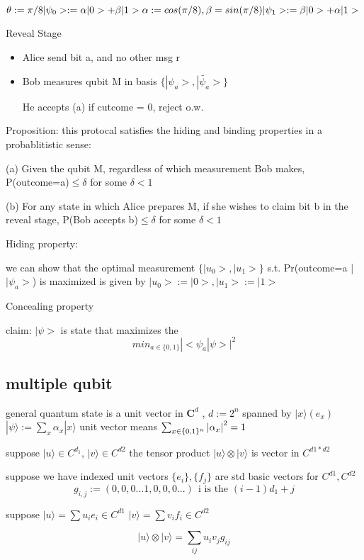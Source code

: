 \documentclass[10pt]{article}
\theoremstyle{break}
\begin{document}
$\theta := \pi/8 \\ |\psi_0> := \alpha |0> + \beta |1>\\
\alpha := cos(\pi/8), \beta = sin(\pi/8)\\|\psi_1>:=\beta |0> + \alpha |1>$

Reveal Stage 
\begin{itemize}
    \item Alice send bit a, and no other msg r 
    \item Bob measures qubit M in basis
     $\{|\psi_a>, |\tilde{\psi_a}>\}$

     He accepts (a) if cutcome = 0, reject o.w.
\end{itemize}

Proposition: this protocal satisfies the hiding and binding properties
in a probablitistic sense:

(a) Given the qubit M, regardless of which measurement Bob makes,
P(outcome=a)$\leq \delta$ for some $\delta < 1 $

(b) For any state in which Alice prepares M, if she wishes to claim bit b 
in the reveal stage, 
P(Bob accepts b)$\leq \delta$ for some $\delta < 1 $

Hiding property:

we can show that the optimal measurement $\{|u_0>,|u_1>\}$
s.t. Pr(outcome=a | $|\psi_a>$) is maximized is given by 
$|u_0> := |0>, |u_1>:=|1>$

Concealing property 

claim: $|\psi>$ is state that maximizes the $$min_{a\in \{
    0,1\}} |<\psi_a|\psi>|^2$$

\subsection{multiple qubit}
general quantum state is a unit vector in $\mathbf{C}^d$
, $d:=2^n$ spanned by $|x\rangle (e_x)$
$|\psi\rangle :=\sum_x\alpha_x|x\rangle$
unit vector means $\sum_{x\in\{0,1\}^n}\abs{\alpha_x}^2=1$

suppose $|u\rangle \in C^{d_1}$, $|v\rangle \in C^{d2}$ the tensor product 
$|u\rangle \otimes |v\rangle$ is vector in $C^{d1*d2}$

suppose we have indexed unit vectors $\{e_i\}, \{f_j\}$ are std basic vectors 
for $C^{d1}, C^{d2}$ 
$$g_{i,j}:=(0,0,0...1,0,0,0...)~~ \text{i is the } (i-1)d_1+j$$

suppose 
$|u\rangle=\sum u_ie_i\in C^{d1}$
$|v\rangle=\sum v_if_i\in C^{d2}$

$$|u\rangle \otimes |v\rangle = \sum_{ij}u_iv_jg_{ij}$$
\end{document}
